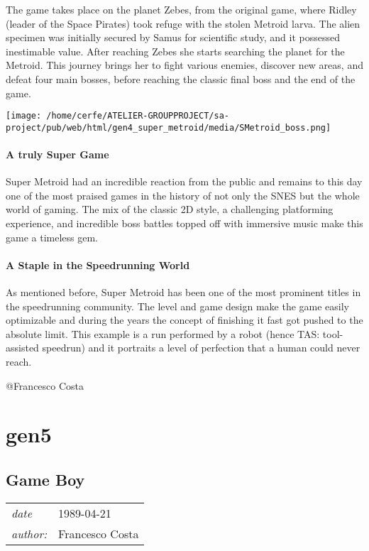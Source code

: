 \documentclass[a4paper,10pt]{book}
\newcommand{\pageHeader}[4]{
    \section{#1}
    \vspace{-0.3cm}
    \begin{table}[h!]
     \begin{tabular}{ll}
        \hline
        \textit{date} & #2 \\
        \textit{author: } & #3\\
        \hline
     \end{tabular}
    \end{table}
    \vspace{-0.3cm}
}
\begin{document}
          The game takes place on the planet Zebes, from the original game,
          where Ridley (leader of the Space Pirates) took refuge with the stolen
          Metroid larva. The alien specimen was initially secured by Samus for
          scientific study, and it possessed inestimable value. After reaching
          Zebes she starts searching the planet for the Metroid. This journey
          brings her to fight various enemies, discover new areas, and defeat four
          main bosses, before reaching the classic final boss and the end of the game.
         
 
 \texttt{[image: /home/cerfe/ATELIER-GROUPPROJECT/sa-project/pub/web/html/gen4\_super\_metroid/media/SMetroid\_boss.png]}
 
 \subsubsection{A truly Super Game }
 
          Super Metroid had an incredible reaction from the public and remains
          to this day one of the most praised games in the history of not only
          the SNES but the whole world of gaming. The mix of the classic 2D
          style, a challenging platforming experience, and incredible boss battles
          topped off with immersive music make this game a timeless gem.
         
 
 \subsubsection{A Staple in the Speedrunning World }
 
          As mentioned before, Super Metroid has been one of the most prominent
          titles in the speedrunning community. The level and game design make the
          game easily optimizable and during the years the concept of finishing it
          fast got pushed to the absolute limit. This example is a run performed by
          a robot (hence TAS: tool-assisted speedrun) and it portraits a level of
          perfection that a human could never reach.
         
 
 
 
 @Francesco Costa 
 
 \newpage\chapter{gen5}\newpage\pageHeader{Game Boy}{1989-04-21}{Francesco Costa}{First console of the Game Boy series, developed by Nintendo}
\end{document}
